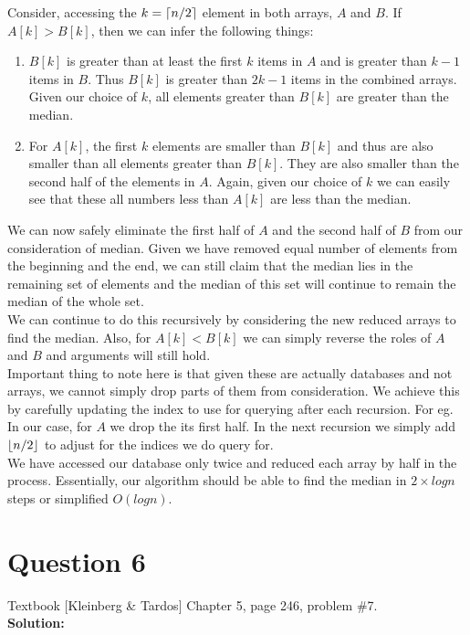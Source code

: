 \documentclass[11pt]{article}
\DeclarePairedDelimiter\ceil{\lceil}{\rceil}
\DeclarePairedDelimiter\floor{\lfloor}{\rfloor}
\begin{document}
Consider, accessing the $ k=\ceil*{n/2} $ element in both arrays, $ A $ and $ B $. If $ A[k] > B[k] $, then we can infer the following things:
\begin{enumerate}
\item $ B[k] $ is greater than at least the first $ k $ items in $ A $ and is greater than $ k-1 $ items in $ B $. Thus $ B[k] $ is greater than $ 2k-1 $ items in the combined arrays. Given our choice of $ k $, all elements greater than $ B[k] $ are greater than the median.
\item For $ A[k] $, the first $ k $ elements are smaller than $ B[k] $ and thus are also smaller than all elements greater than $ B[k] $. They are also smaller than the second half of the elements in $ A $. Again, given our choice of $ k $ we can easily see that these all numbers less than $ A[k] $ are less than the median.
\end{enumerate}
We can now safely eliminate the first half of $ A $ and the second half of $ B $ from our consideration of median. Given we have removed equal number of elements from the beginning and the end, we can still claim that the median lies in the remaining set of elements and the median of this set will continue to remain the median of the whole set. \\

We can continue to do this recursively by considering the new reduced arrays to find the median. Also, for $ A[k] < B[k] $ we can simply reverse the roles of $ A $ and $ B $ and arguments will still hold. \\

Important thing to note here is that given these are actually databases and not arrays, we cannot simply drop parts of them from consideration. We achieve this by carefully updating the index to use for querying after each recursion. For eg. In our case, for $ A $ we drop the its first half. In the next recursion we simply add $ \floor*{n/2} $ to adjust for the indices we do query for. \\

We have accessed our database only twice and reduced each array by half in the process. Essentially, our algorithm should be able to find the median in $ 2 \times logn $ steps or simplified $ O(logn) $.

\clearpage
\section{Question 6} Textbook [Kleinberg \& Tardos] Chapter 5, page 246, problem \#7. \\
\textbf{Solution:} \\
\end{document}
